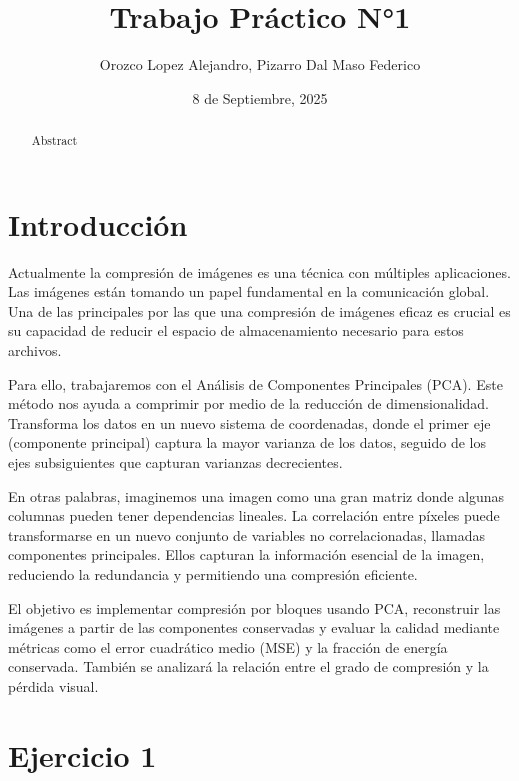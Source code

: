 \documentclass[12pt, a4paper]{article}
\title{Trabajo Práctico N°1}
\author{Orozco Lopez Alejandro, Pizarro Dal Maso Federico}
\date{8 de Septiembre, 2025}
\begin{document}
\setlength{\parskip}{1em}

\captionsetup[table]{name=Tabla}

\maketitle

\begin{abstract}
    
Abstract

\end{abstract}

\section{Introducción}

Actualmente la compresión de imágenes es una técnica con múltiples aplicaciones. 
Las imágenes están tomando un papel fundamental en la comunicación global. 
Una de las principales por las que una compresión de imágenes eficaz es crucial es su capacidad de reducir el espacio de almacenamiento necesario para estos archivos.

Para ello, trabajaremos con el Análisis de Componentes Principales (PCA). 
Este método nos ayuda a comprimir por medio de la reducción de dimensionalidad.
Transforma los datos en un nuevo sistema de coordenadas, donde el primer eje (componente principal) captura la mayor varianza de los datos, seguido de los ejes subsiguientes que capturan varianzas decrecientes.

En otras palabras, imaginemos una imagen como una gran matriz donde algunas columnas pueden tener dependencias lineales. 
La correlación entre píxeles puede transformarse en un nuevo conjunto de variables no correlacionadas, llamadas componentes principales. 
Ellos capturan la información esencial de la imagen, reduciendo la redundancia y permitiendo una compresión eficiente.

El objetivo es implementar compresión por bloques usando PCA, reconstruir las imágenes a partir de las componentes conservadas y evaluar la calidad mediante métricas como el error cuadrático medio (MSE) y la fracción de energía conservada. 
También se analizará la relación entre el grado de compresión y la pérdida visual.

\section{Ejercicio 1}
\end{document}
